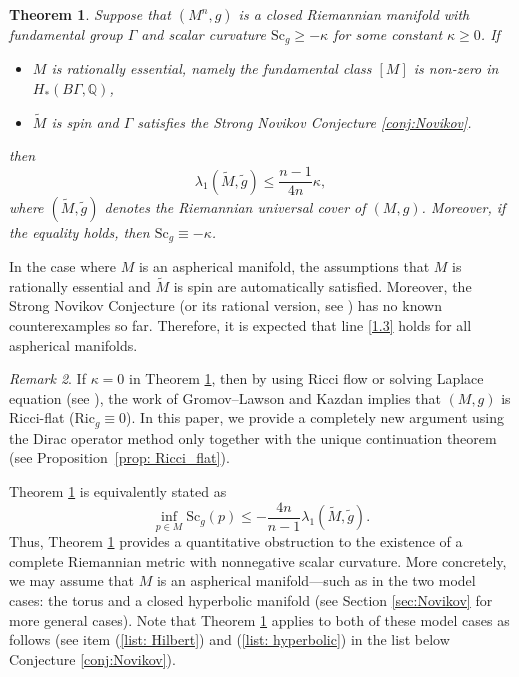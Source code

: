 \documentclass[12pt, reqno]{amsart}
\theoremstyle{plain}%
\newtheorem{theorem}{Theorem}[section]
\theoremstyle{definition}
\theoremstyle{remark}
\newtheorem{remark}[theorem]{Remark}
\numberwithin{equation}{section}
\newcommand{\Sc}{\mathrm{Sc}}
\newcommand{\Ric}{\mathrm{Ric}}
\begin{document}
\begin{theorem} \label{thm: cocompact_rigidity}
Suppose that $(M^n, g)$ is a closed Riemannian manifold with fundamental group $\Gamma$ and scalar curvature $\Sc_g \geq -\kappa$ for some constant $\kappa \geq 0$. If
\begin{itemize}
\item $M$ is rationally essential, namely the fundamental class $[M]$ is non-zero in $H_*(B\Gamma,\mathbb Q)$,
\item $\widetilde M$ is spin and $\Gamma$ satisfies the Strong Novikov Conjecture \ref{conj:Novikov}.
\end{itemize}
then
\begin{equation}\label{1.3}
    \lambda_1(\widetilde{M}, \widetilde{g}) \leq \frac{n-1}{4n} \kappa,
\end{equation}
where $(\widetilde{M}, \widetilde{g})$ denotes the Riemannian universal cover of $(M, g)$. Moreover, if the equality holds, then $\Sc_g \equiv -\kappa$.
\end{theorem}

In the case where $M$ is an aspherical manifold, the assumptions that $M$ is rationally essential and $\widetilde{M}$ is spin are automatically satisfied. Moreover, the Strong Novikov Conjecture (or its rational version, see \cite{MR4268302}) has no known counterexamples so far. Therefore, it is expected that line \eqref{1.3} holds for all aspherical manifolds. 

\begin{remark}
   If $\kappa = 0$ in Theorem \ref{thm: cocompact_rigidity}, then by using Ricci flow or solving Laplace equation (see \cites{Kazdan,GromovLawson}),  the work of Gromov–Lawson and Kazdan implies that $(M, g)$ is Ricci-flat ($\Ric_g \equiv 0$). In this paper, we provide a completely new argument using the Dirac operator method only together with the unique continuation theorem (see Proposition~\ref{prop: Ricci_flat}).
\end{remark}



Theorem \ref{thm: cocompact_rigidity} is equivalently stated as
\begin{equation} \label{eq: scalar_quantitative}
    \inf_{p \in M} \Sc_g(p) \leq -\frac{4n}{n-1} \lambda_1(\widetilde{M}, \widetilde{g}).
\end{equation}
Thus, Theorem \ref{thm: cocompact_rigidity} provides a quantitative obstruction to the existence of a complete Riemannian metric with nonnegative scalar curvature. More concretely, we may assume that $M$ is an aspherical manifold—such as in the two model cases: the torus and a closed hyperbolic manifold (see Section \ref{sec:Novikov} for more general cases). Note that Theorem \ref{thm: cocompact_rigidity} applies to both of these model cases as follows (see item (\ref{list: Hilbert}) and (\ref{list: hyperbolic}) in the list below Conjecture \ref{conj:Novikov}).
 
\end{document}
